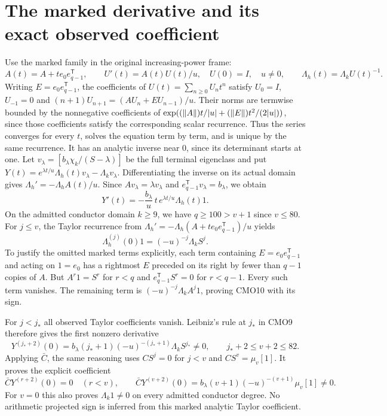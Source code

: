 \section{The marked derivative and its exact observed coefficient}
Use the marked family in the original increasing-power frame:
\[
 A(t)=A+t e_0e_{q-1}^{\mathsf T},\qquad
 U'(t)=A(t)U(t)/u,\quad U(0)=I,\quad u\ne0,
 \qquad \Lambda_h(t)=\Lambda_kU(t)^{-1}.
\]
Writing $E=e_0e_{q-1}^{\mathsf T}$, the coefficients of
$U(t)=\sum_{n\ge0}U_nt^n$ satisfy $U_0=I$, $U_{-1}=0$ and
$(n+1)U_{n+1}=(AU_n+EU_{n-1})/u$.
Their norms are termwise bounded by the nonnegative coefficients
of $\exp((\left\lVert A\right\rVert)t/|u|+(\left\lVert E\right\rVert)t^2/(2|u|))$, since those
coefficients satisfy the corresponding scalar recurrence.
Thus the series converges for every $t$, solves the equation
term by term, and is unique by the same recurrence.
It has an analytic inverse near $0$, since its determinant
starts at one.
Let $v_\lambda=[b_\lambda\chi_k/(S-\lambda)]$ be the full
terminal eigenclass and put
$Y(t)=e^{\lambda t/u}\Lambda_h(t)v_\lambda-\Lambda_kv_\lambda$.
Differentiating the inverse on its actual domain gives
$\Lambda_h'=-\Lambda_h A(t)/u$.
Since $Av_\lambda=\lambda v_\lambda$ and
$e_{q-1}^{\mathsf T}v_\lambda=b_\lambda$, we obtain
\begin{equation}\tag{CMO9}
 Y'(t)=-\frac{b_\lambda}{u}\,t\,e^{\lambda t/u}
                               \Lambda_h(t)1 .
\end{equation}
On the admitted conductor domain $k\ge9$, we have
$q\ge100>v+1$ since $v\le80$.
For $j\le v$, the Taylor recurrence from
$\Lambda_h'=-\Lambda_h(A+t e_0e_{q-1}^{\mathsf T})/u$ yields
\begin{equation}\tag{CMO10}
 \Lambda_h^{(j)}(0)1=(-u)^{-j}\Lambda_kS^j.
\end{equation}
To justify the omitted marked terms explicitly, each term
containing $E=e_0e_{q-1}^{\mathsf T}$ and acting on $1=e_0$
has a rightmost $E$ preceded on its right by fewer than $q-1$
copies of $A$. But $A^r1=S^r$ for $r<q$ and
$e_{q-1}^{\mathsf T}S^r=0$ for $r<q-1$.
Every such term vanishes. The remaining term is
$(-u)^{-j}\Lambda_kA^j1$, proving CMO10 with its sign.

For $j<j_*$ all observed Taylor coefficients vanish.
Leibniz's rule at $j_*$ in CMO9 therefore gives the first
nonzero derivative
\begin{equation}\tag{CMO11}
 \boxed{Y^{(j_*+2)}(0)
 =b_\lambda(j_*+1)(-u)^{-(j_*+1)}\Lambda_kS^{j_*}\ne0,
 \qquad j_*+2\le v+2\le82.}
\end{equation}
Applying $\bar C$, the same reasoning uses $CS^j=0$ for
$j<v$ and $CS^v=\mu_v[1]$. It proves the explicit coefficient
\begin{equation}\tag{CMO12}
 \bar C Y^{(r+2)}(0)=0\quad(r<v),\qquad
 \boxed{\bar C Y^{(v+2)}(0)
 =b_\lambda(v+1)(-u)^{-(v+1)}\mu_v[1]\ne0.}
\end{equation}
For $v=0$ this also proves $\Lambda_k1\ne0$ on every
admitted conductor degree. No arithmetic projected sign is
inferred from this marked analytic Taylor coefficient.

